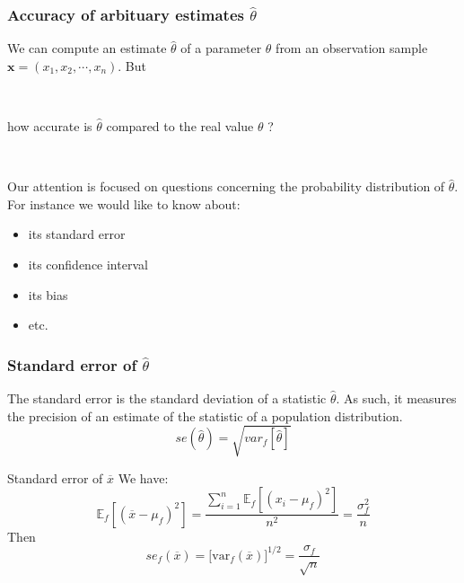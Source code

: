 \frame
{
\frametitle{Accuracy of arbituary estimates $\hat{\theta}$}


We can compute an estimate $\hat{\theta}$ of a parameter $\theta$ from an observation sample $\mathbf{x}=(x_1,x_2,\cdots,x_n)$. But 

\

\alert{how accurate is $\hat{\theta}$ compared to the real value $\theta$ ?}

\

Our attention is focused on questions concerning the probability distribution of $\hat{\theta}$. For instance we would like to know about:
\begin{itemize}
\item its standard error
\item its confidence interval
\item its bias
\item etc. 
\end{itemize}

}




\frame
{
\frametitle{Standard error of $\hat{\theta}$}
\begin{definition}
The \alert{standard error} is the standard deviation  of a statistic $\hat{\theta}$. As such, it measures the precision of an estimate of the statistic  of a population distribution.
$$
se(\hat{\theta})=\sqrt{var_{f}{[\hat{\theta}]}}
$$
\end{definition}


\begin{exampleblock}{Standard error of  $\overline{x}$}
We have:
$$
\mathbb{E}_{f}\left\lbrack (\overline{x}-\mu_f)^2\right\rbrack=%
\frac{\sum_{i=1}^n \mathbb{E}_{f}\left\lbrack (x_i-\mu_{f})^2\right\rbrack}{n^2}=\frac{\sigma_{f}^{2}}{n}
$$
Then
$$
se_{f}(\overline{x})=\lbrack\mathrm{var}_{f}(\overline{x})\rbrack^{1/2}=\frac{\sigma_{f}}{\sqrt{n}}
$$

\end{exampleblock}
}


